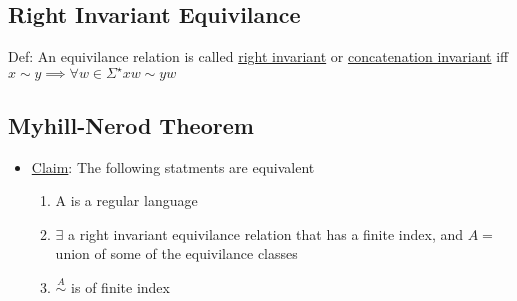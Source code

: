 \documentclass[11pt]{article}
\begin{document}
\subsection{Right Invariant Equivilance}
\label{sec-2.9}

   Def: An equivilance relation is called \underline{right invariant} or
   \underline{concatenation invariant} iff $x\sim y \implies \forall w \in
   \Sigma^{\star} xw\sim yw$
\subsection{Myhill-Nerod Theorem}
\label{sec-2.10}

\begin{itemize}
\item \underline{Claim}: The following statments are equivalent

\begin{enumerate}
\item A is a regular language
\item $\exists$ a right invariant equivilance relation that has a
      finite index, and $A=$ union of some of the equivilance classes
\item $\stackrel{A}{\sim}$ is of finite index
\end{enumerate}

\end{itemize}
   
\end{document}
